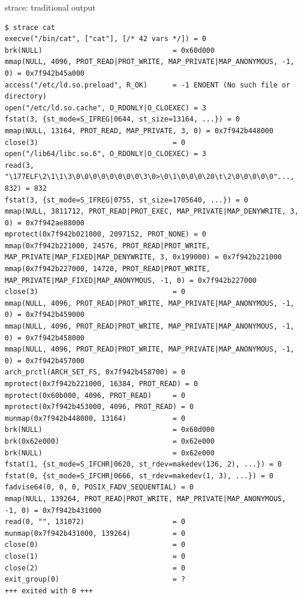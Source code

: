 \documentclass[pdf]{beamer}
\begin{document}
\begin{frame}[fragile]{strace: traditional output}
\begin{adjustwidth}{-1em}{-1em}
    \tiny
\begin{verbatim}
$ strace cat
execve("/bin/cat", ["cat"], [/* 42 vars */]) = 0
brk(NULL)                               = 0x60d000
mmap(NULL, 4096, PROT_READ|PROT_WRITE, MAP_PRIVATE|MAP_ANONYMOUS, -1, 0) = 0x7f942b45a000
access("/etc/ld.so.preload", R_OK)      = -1 ENOENT (No such file or directory)
open("/etc/ld.so.cache", O_RDONLY|O_CLOEXEC) = 3
fstat(3, {st_mode=S_IFREG|0644, st_size=13164, ...}) = 0
mmap(NULL, 13164, PROT_READ, MAP_PRIVATE, 3, 0) = 0x7f942b448000
close(3)                                = 0
open("/lib64/libc.so.6", O_RDONLY|O_CLOEXEC) = 3
read(3, "\177ELF\2\1\1\3\0\0\0\0\0\0\0\0\3\0>\0\1\0\0\0\20\t\2\0\0\0\0\0"..., 832) = 832
fstat(3, {st_mode=S_IFREG|0755, st_size=1705640, ...}) = 0
mmap(NULL, 3811712, PROT_READ|PROT_EXEC, MAP_PRIVATE|MAP_DENYWRITE, 3, 0) = 0x7f942ae88000
mprotect(0x7f942b021000, 2097152, PROT_NONE) = 0
mmap(0x7f942b221000, 24576, PROT_READ|PROT_WRITE, MAP_PRIVATE|MAP_FIXED|MAP_DENYWRITE, 3, 0x199000) = 0x7f942b221000
mmap(0x7f942b227000, 14720, PROT_READ|PROT_WRITE, MAP_PRIVATE|MAP_FIXED|MAP_ANONYMOUS, -1, 0) = 0x7f942b227000
close(3)                                = 0
mmap(NULL, 4096, PROT_READ|PROT_WRITE, MAP_PRIVATE|MAP_ANONYMOUS, -1, 0) = 0x7f942b459000
mmap(NULL, 4096, PROT_READ|PROT_WRITE, MAP_PRIVATE|MAP_ANONYMOUS, -1, 0) = 0x7f942b458000
mmap(NULL, 4096, PROT_READ|PROT_WRITE, MAP_PRIVATE|MAP_ANONYMOUS, -1, 0) = 0x7f942b457000
arch_prctl(ARCH_SET_FS, 0x7f942b458700) = 0
mprotect(0x7f942b221000, 16384, PROT_READ) = 0
mprotect(0x60b000, 4096, PROT_READ)     = 0
mprotect(0x7f942b453000, 4096, PROT_READ) = 0
munmap(0x7f942b448000, 13164)           = 0
brk(NULL)                               = 0x60d000
brk(0x62e000)                           = 0x62e000
brk(NULL)                               = 0x62e000
fstat(1, {st_mode=S_IFCHR|0620, st_rdev=makedev(136, 2), ...}) = 0
fstat(0, {st_mode=S_IFCHR|0666, st_rdev=makedev(1, 3), ...}) = 0
fadvise64(0, 0, 0, POSIX_FADV_SEQUENTIAL) = 0
mmap(NULL, 139264, PROT_READ|PROT_WRITE, MAP_PRIVATE|MAP_ANONYMOUS, -1, 0) = 0x7f942b431000
read(0, "", 131072)                     = 0
munmap(0x7f942b431000, 139264)          = 0
close(0)                                = 0
close(1)                                = 0
close(2)                                = 0
exit_group(0)                           = ?
+++ exited with 0 +++
\end{verbatim}
\end{adjustwidth}
\end{frame}
\end{document}
